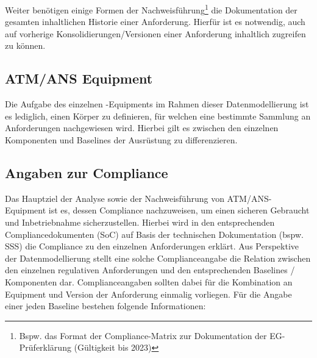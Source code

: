 Weiter benötigen einige Formen der Nachweisführung\footnote{Bspw. das Format der Compliance-Matrix zur Dokumentation der EG-Prüferklärung (Gültigkeit bis 2023)} die Dokumentation der gesamten inhaltlichen Historie einer Anforderung.
Hierfür ist es notwendig, auch auf vorherige Konsolidierungen/Versionen einer Anforderung inhaltlich zugreifen zu können. 

\subsection{ATM/ANS Equipment}

Die Aufgabe des einzelnen \atmans-Equipments im Rahmen dieser Datenmodellierung ist es lediglich, einen Körper zu definieren, für welchen eine bestimmte Sammlung an Anforderungen nachgewiesen wird.
Hierbei gilt es zwischen den einzelnen Komponenten und Baselines der Ausrüstung zu differenzieren.

\pagebreak

\subsection{Angaben zur Compliance} \label{model_angaben}

Das Hauptziel der Analyse sowie der Nachweisführung von ATM/ANS-Equipment ist es, dessen Compliance nachzuweisen, um einen sicheren Gebraucht und Inbetriebnahme sicherzustellen. 
Hierbei wird in den entsprechenden Compliancedokumenten (\ac{SoC}) auf Basis der technischen Dokumentation (bspw. \ac{SSS}) die Compliance zu den einzelnen Anforderungen erklärt.
Aus Perspektive der Datenmodellierung stellt eine solche Complianceangabe die Relation zwischen den einzelnen regulativen Anforderungen und den entsprechenden Baselines / Komponenten dar.
Complianceangaben sollten dabei für die Kombination an Equipment und Version der Anforderung einmalig vorliegen. 
Für die Angabe einer jeden Baseline bestehen folgende Informationen: 

